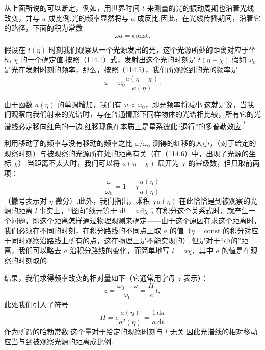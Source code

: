 从上面所说的可以断定，例如，用世界时间 $t$ 来测量的光的振动周期也沿着光线改变，并与 $a$ 成比例.光的频率显然将与 $a$ 成反比.因此，在光线传播期间，沿着它的路径，下面的积为常数
\begin{equation}
  \omega a=\mathrm{const}.
\end{equation}

假设在 $t(\eta)$ 时刻我们观察从一个光源发出的光，这个光源所处的距离对应于坐标 $\chi$ 的一个确定值.按照（114.1）式，发射出这个光的时刻是 $t(\eta-\chi)$.假如 $\omega_{0}$ 是光在发射时刻的频率，那么，按照（114.5），我们所观察到的光的频率是
\begin{equation}
  \omega=\omega_{0}\frac{a(\eta-\chi)}{a(\eta)}.
\end{equation}

由于函数 $a(\eta)$ 的单调增加，我们有 $\omega<\omega_{0}$，即光频率将减小.这就是说，当我们观察向我们射来的光谱时，与在普通情形下同样物体的光谱相比较，所有它的光谱线必定移向红色的一边.红移现象在本质上是星系彼此“退行”的多普勒效应.\textsuperscript{*}{\renewcommand{\thefootnote}{*}}

利用移动了的频率与没有移动的频率之比 $\omega/\omega_{0}$ 测得的红移的大小，（对于给定的观察时刻）与被观察的光源所在处的距离有关（在（114.6）中，出现了光源的坐标 $\chi$）.当距离不太大时，我们可以将 $a(\eta-\chi)$ 展开为 $\chi$ 的幂级数，但只取前两项：
\begin{equation*}
  \frac{\omega}{\omega_{0}}=1-\chi\frac{a(\eta)}{a(\eta)}
\end{equation*}
（撇号表示对 $\eta$ 微分）.此外，我们指出，乘积 $\chi a(\eta)$ 在此恰恰是到被观察的光源的距离 $l$.事实上，“径向”线元等于 $\mathrm{d}l=a\,\mathrm{d}\chi$；在积分这个关系式时，就产生一个问题，即这个距离怎样通过物理观测来确定——由于这个原因在求这个距离时，我们必须在不同的时刻，在积分路线的不同点上取 $a$ 的值（$\eta=\mathrm{const}$ 的积分对应于同时观察沿路线上所有的点，这在物理上是不能实现的）.但是对于“小的”距离，我们可以略去 $a$ 沿积分路线的变化，而简单地写 $l=a\chi$，其中 $a$ 的值是在观察的时刻取的.

结果，我们求得频率改变的相对量如下（它通常用字母 $z$ 表示）：
\begin{equation}
  z=\frac{\omega_{0}-\omega}{\omega_{0}}=\frac{H}{c}\,l,
\end{equation}
此处我们引入了符号
\begin{equation}
  H=c\frac{a(\eta)}{a^{2}(\eta)}=\frac{1}{a}\frac{\mathrm{d}a}{\mathrm{d}t}
\end{equation}
作为所谓的哈勃常数.这个量对于给定的观察时刻与 $l$ 无关.因此光谱线的相对移动应当与到被观察光源的距离成比例.

